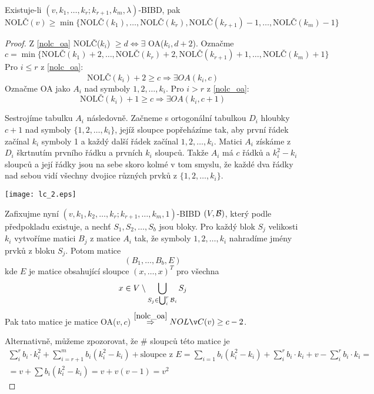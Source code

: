 \begin{theorem}\label{nolc_lower_2}~\\
    Existuje-li $(v,k_1,\ldots,k_r;k_{r+1},k_m,\lambda)$-BIBD, pak
    \[ \text{NOLČ}(v) \geq \min\{\text{NOLČ}(k_1), \ldots, \text{NOLČ}(k_r), \text{NOLČ}(k_{r+1}) - 1, \ldots, \text{NOLČ}(k_m) - 1\} \]
\end{theorem}
\begin{proof}
	Z \cref{nolc_oa} NOLČ($k_i$) $\geq d \iff \exists$ OA($k_i, d + 2$).
	Označme
	\[ c = \min\{\text{NOLČ}(k_1) + 2, \ldots, \text{NOLČ}(k_r) + 2, \text{NOLČ}(k_{r+1}) + 1, \ldots, \text{NOLČ}(k_m) + 1\} \]
	Pro $i \leq r$ z \cref{nolc_oa}:
	\[ \text{NOLČ}(k_i) + 2 \geq c \Rightarrow \exists OA(k_i, c) \]
	Označme OA jako $A_i$ nad symboly $1, 2, \ldots, k_i$.
	Pro $i > r$ z \cref{nolc_oa}:
	\[ \text{NOLČ}(k_i) + 1 \geq c \Rightarrow \exists OA(k_i, c + 1) \]

	Sestrojíme tabulku $A_i$ následovně.
	Začneme s ortogonální tabulkou $D_i$ hloubky $c + 1$ nad symboly $\{ 1, 2, \ldots, k_i \}$, jejíž sloupce popřeházíme tak, aby první řádek začínal $k_i$ symboly 1 a každý další řádek začínal $1, 2, \ldots, k_i$.
	Matici $A_i$ získáme z $D_i$ škrtnutím prvního řádku a prvních $k_i$ sloupců.
	Takže $A_i$ má $c$ řádků a $k_i^2 - k_i$ sloupců a její řádky jsou na sebe skoro kolmé v tom smyslu, že každé dva řádky nad sebou vidí všechny dvojice různých prvků z $\{1, 2, \ldots, k_i \}$.

	\texttt{[image: lc\_2.eps]}

	Zafixujme nyní $(v, k_1, k_2, \ldots, k_r; k_{r + 1}, \ldots, k_m, 1)$-BIBD $(V, \operatorname{\mathcal{B}})$, který podle předpokladu existuje, a nechť $S_1, S_2, \ldots, S_b$ jsou bloky.
	Pro každý blok $S_j$ velikosti $k_i$ vytvoříme matici $B_j$ z matice $A_i$ tak, že symboly $1, 2, \ldots, k_i$ nahradíme jmény prvků z bloku $S_j$.
	Potom matice
	\[ (B_1, \ldots, B_b, E) \]
	kde $E$ je matice obsahující sloupce $(x, \ldots, x)^T$ pro všechna
	\[ x \in V \setminus \bigcup_{S_j \in \bigcup_i^r \operatorname{\mathcal{B}}_i} S_j \]
	Pak tato matice je matice OA($v, c$) $\stackrel{\cref{nolc_oa}}{\Rightarrow} NOLČ(v) \geq c - 2$.

	Alternativně, můžeme zpozorovat, že \# sloupců této matice je
	\begin{gather*}
		\sum_i^r b_i \cdot k_i^2 + \sum_{i = r + 1}^{m} b_i (k_i^2 - k_i) + \text{sloupce z }E =  \sum_{i = 1} b_i (k_i^2 - k_i) + \sum_i^r b_i \cdot k_i + v - \sum_i^r b_i \cdot k_i =\\
		= v + \sum b_i (k_i^2 - k_i) = v + v(v - 1) = v^2
	\end{gather*}

\end{proof}

